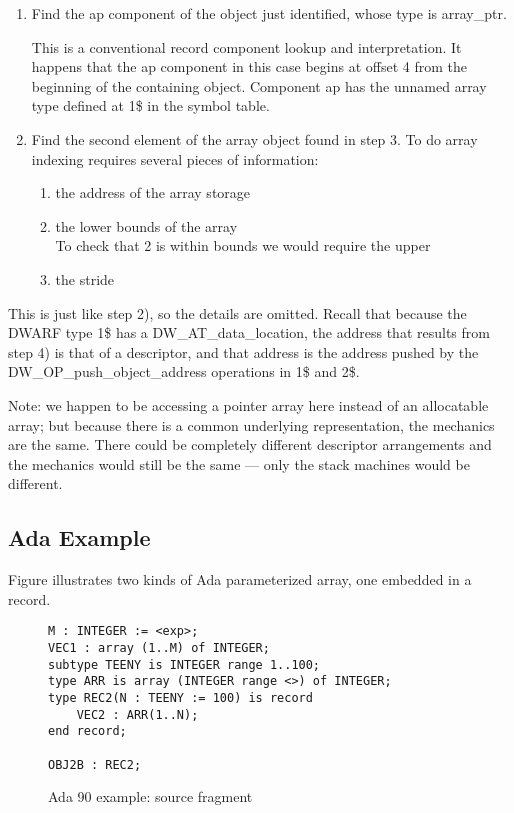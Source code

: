 \begin{enumerate}[1.]
\item  Find the ap component of the object just identified,
whose type is array\_ptr.

This is a conventional record component lookup and
interpretation. It happens that the ap component in this case
begins at offset 4 from the beginning of the containing object.
Component ap has the unnamed array type defined at 1\$ in the
symbol table.

\item  Find the second element of the array object found in step 3. To do array indexing requires
several pieces of information:

\begin{enumerate}[a]
\item  the address of the array storage

\item  the lower bounds of the array \\
\lbrack To check that 2 is within bounds we would require the upper

\item  the stride

\end{enumerate}
\end{enumerate}

This is just like step 2), so the details are omitted. Recall
that because the DWARF type 1\$ has a DW\-\_AT\-\_data\-\_location,
the address that results from step 4) is that of a
descriptor, and that address is the address pushed by the
DW\-\_OP\-\_push\-\_object\-\_address operations in 1\$ and 2\$.

Note: we happen to be accessing a pointer array here instead
of an allocatable array; but because there is a common
underlying representation, the mechanics are the same. There
could be completely different descriptor arrangements and the
mechanics would still be the same — only the stack machines
would be different.



\subsection{Ada Example}
\label{app:adaexample}

Figure 
illustrates two kinds of Ada parameterized array, one embedded in a record.


\begin{figure}[here]
\begin{lstlisting}
M : INTEGER := <exp>;
VEC1 : array (1..M) of INTEGER;
subtype TEENY is INTEGER range 1..100;
type ARR is array (INTEGER range <>) of INTEGER;
type REC2(N : TEENY := 100) is record
    VEC2 : ARR(1..N);
end record;

OBJ2B : REC2;
\end{lstlisting}
\caption{Ada 90 example: source fragment} \label{fig:adaexamplesourcefragment}
\end{figure}

